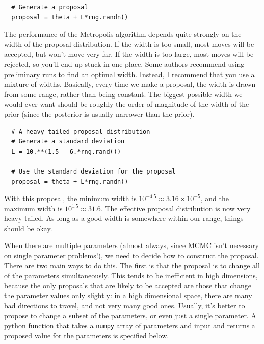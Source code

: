 \begin{verbatim}
  # Generate a proposal
  proposal = theta + L*rng.randn()
\end{verbatim}

The performance of the Metropolis algorithm depends quite strongly on
the width of the proposal distribution. If the width is too small, most moves
will be accepted, but won't move very far. If the width is too large, most
moves will be rejected, so you'll end up stuck in one place. Some authors
recommend using preliminary runs to find an optimal width. Instead, I recommend
that you use a mixture of widths. Basically, every time we make a proposal,
the width is drawn from some range, rather than being constant. The biggest
possible width we would ever want should be roughly the order of magnitude of
the width of the prior (since the posterior is usually narrower than the
prior).
\begin{verbatim}
  # A heavy-tailed proposal distribution
  # Generate a standard deviation
  L = 10.**(1.5 - 6.*rng.rand())

  # Use the standard deviation for the proposal
  proposal = theta + L*rng.randn()
\end{verbatim}
With this proposal, the minimum width is
$10^{-4.5} \approx 3.16 \times 10^{-5}$, and the maximum width is
$10^{1.5} \approx 31.6$. The effective proposal distribution is now very heavy-tailed. As long as a good width is somewhere within our range, things should be
okay.

When there are multiple parameters (almost always, since MCMC isn't necessary
on single parameter problems!), we need to decide how to construct the proposal.
There are two main ways to do this. The first is that the proposal is to
change all of the parameters simultaneously. This tends to be inefficient in
high dimensions, because the only proposals that are likely to be accepted
are those that change the parameter values only slightly: in a high dimensional
space, there are many bad directions to travel, and not very many good ones.
Usually, it's better to propose to change a subset of the parameters, or even
just a single parameter. A python function that takes a {\tt numpy} array of
parameters and input and returns a proposed value for the parameters is
specified below.

